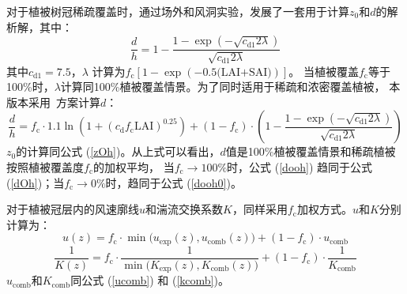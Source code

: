 对于植被树冠稀疏覆盖时，\citet{raupach1992drag,raupach1994simplified}通过场外和风洞实验，发展了一套用于计算$z_0$和$d$的解析解，其中：
\begin{equation}\label{dooh0}
  \frac{d}{h}=1-\frac{1-\exp \left(-\sqrt{c_{\mathrm{d1}} 2 \lambda}\right)}{\sqrt{c_{\mathrm{d1}} 2 \lambda}}
\end{equation}
其中$c_{\mathrm{d1}}=7.5$，$\lambda$%
计算为$f_{\mathrm {c}}\left[1-\exp{\left(-0.5\text{(LAI+SAI)}\right)}\right]$。
当植被覆盖$f_{\mathrm {c}}$等于100\%时，$\lambda$计算同100\%植被覆盖情景。为了同时适用于稀疏和浓密覆盖植被，
本版本采用~\citet{dai2019different}方案计算$d$：
\begin{equation}\label{dooh}
  \frac{d}{h}=f_{\mathrm{c}} \cdot 1.1 \ln \left(1+\left(c_{\mathrm{d}} f_{\mathrm{c}} \text{LAI}\right)^{0.25}\right)+\left(1-f_{\mathrm{c}}\right) \cdot\left(1-\frac{1-\exp \left(-\sqrt{c_{\mathrm{d1}} 2 \lambda}\right)}{\sqrt{c_{\mathrm{d1}} 2 \lambda}}\right)
\end{equation}
$z_0$的计算同公式 (\ref{zOh})。从上式可以看出，$d$值是100\%植被覆盖情景和稀疏植被按照植被覆盖度$f_{\mathrm {c}}$的加权平均，
当$f_{\mathrm {c}}\rightarrow100\%$时，公式 (\ref{dooh}) 趋同于公式 (\ref{dOh})；当$f_{\mathrm {c}}\rightarrow0\%$时，趋同于公式 (\ref{dooh0})。


对于植被冠层内的风速廓线$u$和湍流交换系数$K$，同样采用$f_{\mathrm {c}}$加权方式。$u$和$K$分别计算为：
\begin{equation}
  u(z)=f_{\mathrm{c}} \cdot \min \big(u_{\mathrm{\exp }}(z), u_{\mathrm{comb}}(z)\big)+\left(1-f_{\mathrm{c}}\right) \cdot u_{\mathrm{comb}}
\end{equation}
\begin{equation}
  \frac{1}{K(z)}=f_{\mathrm{c}} \cdot \frac{1}{\min \big(K_{\mathrm{\exp}}(z), K_{\mathrm{comb}}(z)\big)}+\left(1-f_{\mathrm{c}}\right) \cdot \frac{1}{K_{\mathrm{comb}}}
\end{equation}
$u_{\mathrm{comb}}$和$K_{\mathrm{comb}}$同公式 (\ref{ucomb}) 和 (\ref{kcomb})。


